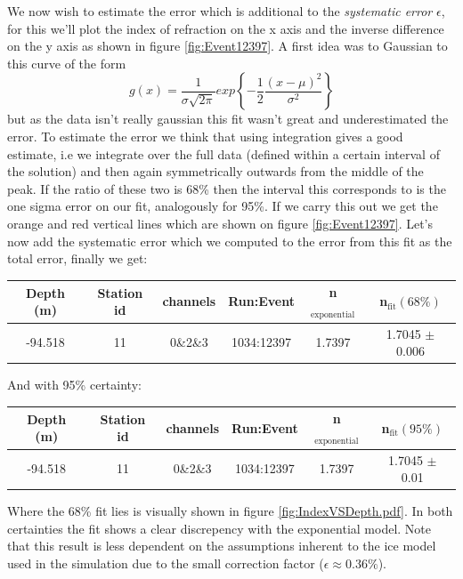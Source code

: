 We now wish to estimate the error which is additional to the
\textit{systematic error} $\epsilon$, for this we'll plot the index
of refraction on the x axis and the inverse difference on the y axis
as shown in figure \ref{fig:Event12397}. A first idea was to
Gaussian to this curve of the form\cite{grabe2005measurement}
\begin{equation}
	g(x) = \frac{1}{\sigma \sqrt{2\pi}} exp\left\{-\frac{1}{2}\frac{(x-\mu)^2}{\sigma^2}\right\}
\end{equation}
but as the data isn't really gaussian this fit wasn't great and underestimated the error.
To estimate the error we think that using integration gives a good
estimate, i.e we integrate over the full data (defined within a certain interval of the solution) and then again symmetrically
outwards from the middle of the peak. If the ratio of these two is 68\% then
the interval this corresponds to is the one sigma error on our fit, analogously
for 95\%. If we carry this out we get the orange and red vertical lines which are shown on figure
\ref{fig:Event12397}. Let's now add the systematic error which we computed
to the error from this fit as the total error, finally we get:
\begin{center}
\begin{tabular}{||c c c c c c||}
 \hline
 Depth (m) & Station id & channels & Run:Event & n$_\text{exponential}$ & n$_\text{fit} (68\%)$\\ [0.5ex]
 \hline\hline
 -94.518 & 11 & 0\&2\&3 & 1034:12397 & 1.7397 & 1.7045 $\pm$ 0.006 \\
 \hline
\end{tabular}
\end{center}
And with 95\% certainty:
\begin{center}
\begin{tabular}{||c c c c c c||}
 \hline
 Depth (m) & Station id & channels & Run:Event & n$_\text{exponential}$ & n$_\text{fit} (95\%)$\\ [0.5ex]
 \hline\hline
 -94.518 & 11 & 0\&2\&3 & 1034:12397 & 1.7397 & 1.7045 $\pm$ 0.01 \\
 \hline
\end{tabular}
\end{center}
Where the 68\% fit lies is visually shown in figure \ref{fig:IndexVSDepth.pdf}.
In both certainties the fit shows a clear discrepency with the
exponential model. Note that this result is less dependent on the assumptions
inherent to the ice model used in the simulation due to the small correction
factor ($\epsilon \approx 0.36\%$).  
